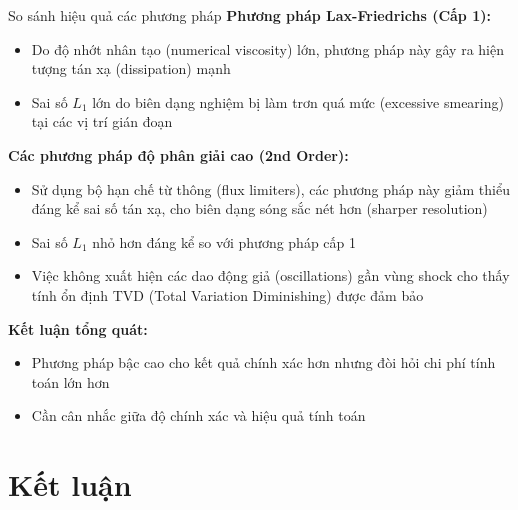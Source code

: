 \documentclass[aspectratio=43,10pt]{beamer}
\begin{document}
\begin{frame}{So sánh hiệu quả các phương pháp}
\textbf{Phương pháp Lax-Friedrichs (Cấp 1):}
\begin{itemize}
    \item Do độ nhớt nhân tạo (numerical viscosity) lớn, phương pháp này gây ra hiện tượng tán xạ (dissipation) mạnh
    \item Sai số $L_1$ lớn do biên dạng nghiệm bị làm trơn quá mức (excessive smearing) tại các vị trí gián đoạn
\end{itemize}

\textbf{Các phương pháp độ phân giải cao (2nd Order):}
\begin{itemize}
    \item Sử dụng bộ hạn chế từ thông (flux limiters), các phương pháp này giảm thiểu đáng kể sai số tán xạ, cho biên dạng sóng sắc nét hơn (sharper resolution)
    \item Sai số $L_1$ nhỏ hơn đáng kể so với phương pháp cấp 1
    \item Việc không xuất hiện các dao động giả (oscillations) gần vùng shock cho thấy tính ổn định TVD (Total Variation Diminishing) được đảm bảo
\end{itemize}

\textbf{Kết luận tổng quát:}
\begin{itemize}
    \item Phương pháp bậc cao cho kết quả chính xác hơn nhưng đòi hỏi chi phí tính toán lớn hơn
    \item Cần cân nhắc giữa độ chính xác và hiệu quả tính toán
\end{itemize}
\end{frame}

\section{Kết luận}
\end{document}
